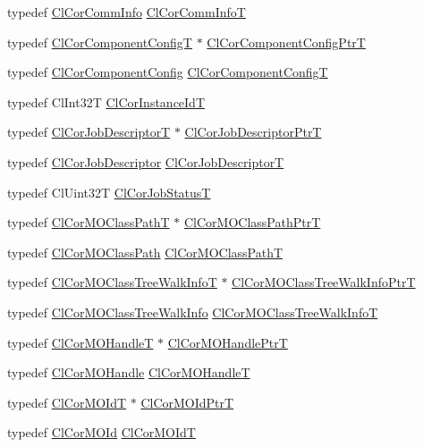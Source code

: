 \begin{CompactItemize}
\item 
typedef \hyperlink{struct_cl_cor_comm_info}{Cl\-Cor\-Comm\-Info} \hyperlink{group__group13_ga23}{Cl\-Cor\-Comm\-Info\-T}
\item 
typedef \hyperlink{struct_cl_cor_component_config}{Cl\-Cor\-Component\-Config\-T} $\ast$ \hyperlink{group__group13_ga1}{Cl\-Cor\-Component\-Config\-Ptr\-T}
\item 
typedef \hyperlink{struct_cl_cor_component_config}{Cl\-Cor\-Component\-Config} \hyperlink{group__group13_ga0}{Cl\-Cor\-Component\-Config\-T}
\item 
typedef Cl\-Int32T \hyperlink{group__group13_ga4}{Cl\-Cor\-Instance\-Id\-T}
\item 
typedef \hyperlink{struct_cl_cor_job_descriptor}{Cl\-Cor\-Job\-Descriptor\-T} $\ast$ \hyperlink{group__group13_ga50}{Cl\-Cor\-Job\-Descriptor\-Ptr\-T}
\item 
typedef \hyperlink{struct_cl_cor_job_descriptor}{Cl\-Cor\-Job\-Descriptor} \hyperlink{group__group13_ga49}{Cl\-Cor\-Job\-Descriptor\-T}
\item 
typedef Cl\-Uint32T \hyperlink{group__group13_ga6}{Cl\-Cor\-Job\-Status\-T}
\item 
typedef \hyperlink{struct_cl_cor_m_o_class_path}{Cl\-Cor\-MOClass\-Path\-T} $\ast$ \hyperlink{group__group13_ga39}{Cl\-Cor\-MOClass\-Path\-Ptr\-T}
\item 
typedef \hyperlink{struct_cl_cor_m_o_class_path}{Cl\-Cor\-MOClass\-Path} \hyperlink{group__group13_ga38}{Cl\-Cor\-MOClass\-Path\-T}
\item 
typedef \hyperlink{struct_cl_cor_m_o_class_tree_walk_info}{Cl\-Cor\-MOClass\-Tree\-Walk\-Info\-T} $\ast$ \hyperlink{group__group13_ga37}{Cl\-Cor\-MOClass\-Tree\-Walk\-Info\-Ptr\-T}
\item 
typedef \hyperlink{struct_cl_cor_m_o_class_tree_walk_info}{Cl\-Cor\-MOClass\-Tree\-Walk\-Info} \hyperlink{group__group13_ga36}{Cl\-Cor\-MOClass\-Tree\-Walk\-Info\-T}
\item 
typedef \hyperlink{struct_cl_cor_m_o_handle}{Cl\-Cor\-MOHandle\-T} $\ast$ \hyperlink{group__group13_ga26}{Cl\-Cor\-MOHandle\-Ptr\-T}
\item 
typedef \hyperlink{struct_cl_cor_m_o_handle}{Cl\-Cor\-MOHandle} \hyperlink{group__group13_ga25}{Cl\-Cor\-MOHandle\-T}
\item 
typedef \hyperlink{struct_cl_cor_m_o_id}{Cl\-Cor\-MOId\-T} $\ast$ \hyperlink{group__group13_ga29}{Cl\-Cor\-MOId\-Ptr\-T}
\item 
typedef \hyperlink{struct_cl_cor_m_o_id}{Cl\-Cor\-MOId} \hyperlink{group__group13_ga28}{Cl\-Cor\-MOId\-T}

\end{CompactItemize}
